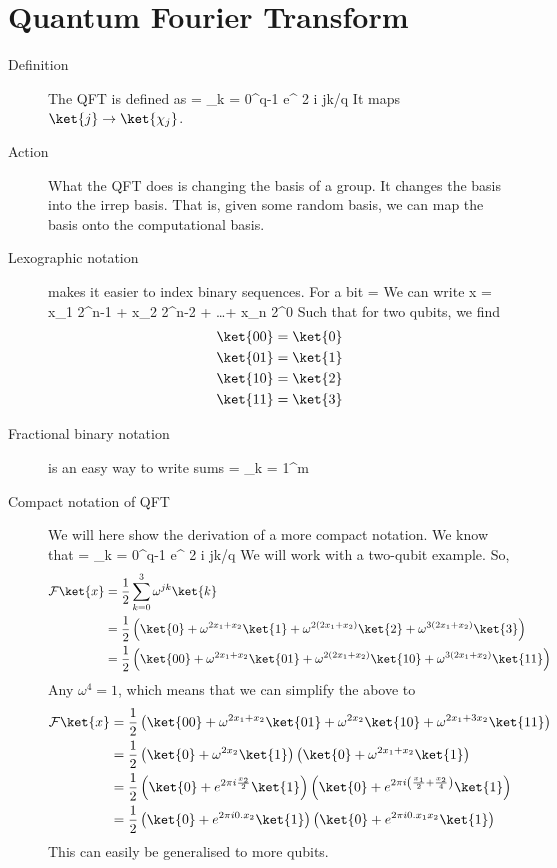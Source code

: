 \section{Quantum Fourier Transform}
\begin{description}
\item[Definition] The QFT is defined as
\beq
{} =  \sum_{k = 0}^{q-1} e^{ 2 \pi i jk/q} 
\eeq
It maps $\ket{j} \rightarrow \ket{\chi_j}$. 

\item[Action]
What the QFT does is changing the basis of a group. It changes the basis into the irrep basis. That is, given some random basis, we can map the basis onto the computational basis. 

\item[Lexographic notation] makes it easier to index binary sequences. For a bit
\beq
{} = 
\eeq
We can write
\beq
x = x_1 2^{n-1} + x_2 2^{n-2} + \ldots  + x_n 2^0
\eeq
Such that for two qubits, we find
\begin{align}
\ket{00} &= \ket{0}  \\
\ket{01} &= \ket{1} \\
\ket{10} &= \ket{2} \\
\ket{11} &= \ket{3}
\end{align}

\item[Fractional binary notation] is an easy way to write sums
\beq
[0.x_1 \ldots x_n] = \sum_{k = 1}^m 
\eeq

\item[Compact notation of QFT] We will here show the derivation of a more compact notation. We know that 
\beq
{} =  \sum_{k = 0}^{q-1} e^{ 2 \pi i jk/q} 
\eeq
We will work with a two-qubit example. So, 
\begin{align}
\mathcal{F}\ket{x} &= \frac{1}{2} \sum_{k = 0}^3 \omega^{jk} \ket{k} \\
&= \frac{1}{2} \left( \ket{0} + \omega^{2x_1 + x_2}\ket{1} + \omega^{2(2x_1 + x_2)}\ket{2} + \omega^{3(2x_1 + x_2)} \ket{3} \right) \\
&= \frac{1}{2} \left( \ket{00} + \omega^{2x_1 + x_2} \ket{01} + \omega^{2(2x_1 + x_2)}\ket{10} + \omega^{3(2x_1 + x_2)} \ket{11} \right)
\end{align}
Any $\omega^4 = 1$, which means that we can simplify the above to 
\begin{align}
\mathcal{F}\ket{x} &= \frac{1}{2} \left( \ket{00} + \omega^{2x_1 + x_2} \ket{01} + \omega^{2x_2} \ket{10} + \omega^{2x_1 + 3x_2} \ket{11} \right) \\
&= \frac{1}{2} \left( \ket{0} + \omega^{2x_2} \ket{1} \right) \left( \ket{0} + \omega^{2x_1 + x_2 } \ket{1} \right) \\
&=\frac{1}{2} \left( \ket{0} + e^{2 \pi i \frac{x_2}{2} } \ket{1} \right) \left( \ket{0} + e^{2\pi i \left( \frac{x_1}{2} + \frac{x_2}{4} \right)} \ket{1} \right) \\
&= \frac{1}{2} \left( \ket{0} + e^{2\pi i 0.x_2} \ket{1} \right) \left( \ket{0} + e^{2\pi i 0.x_1 x_2} \ket{1} \right)
\end{align}
This can easily be generalised to more qubits. 


\end{description}
